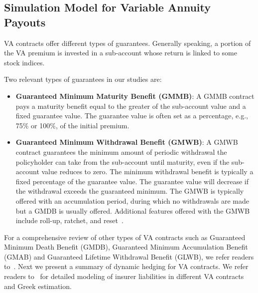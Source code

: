 \subsection{Simulation Model for Variable Annuity Payouts}\label{subsec:VApayout}

VA contracts offer different types of guarantees.
Generally speaking, a portion of the VA premium is invested in a sub-account whose return is linked to some stock indices.

Two relevant types of guarantees in our studies are:
\begin{itemize}[noitemsep]
    \item \textbf{Guaranteed Minimum Maturity Benefit (GMMB)}: A GMMB contract pays a maturity benefit equal to the greater of the sub-account value and a fixed guarantee value.
    The guarantee value is often set as a percentage, e.g., 75\% or 100\%, of the initial premium.

    \item \textbf{Guaranteed Minimum Withdrawal Benefit (GMWB)}: A GMWB contract guarantees the minimum amount of periodic withdrawal the policyholder can take from the sub-account until maturity, even if the sub-account value reduces to zero.
    The minimum withdrawal benefit is typically a fixed percentage of the guarantee value.
    The guarantee value will decrease if the withdrawal exceeds the guaranteed minimum. The GMWB is typically offered with an accumulation period, during which no withdrawals are made but a GMDB is usually offered. Additional features offered with the GMWB include roll-up, ratchet, and reset~\citep{geneva2013variable}.
\end{itemize}
For a comprehensive review of other types of VA contracts such as Guaranteed Minimum Death Benefit (GMDB), Guaranteed Minimum Accumulation Benefit (GMAB) and Guaranteed Lifetime Withdrawal Benefit (GLWB), we refer readers to~\cite{hardy2003investment}.
Next we present a summary of dynamic hedging for VA contracts.
We refer readers to~\cite{dang2021efficient} for detailed modeling of insurer liabilities in different VA contracts and Greek estimation.

